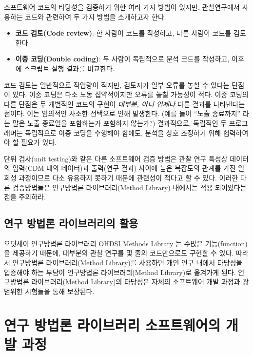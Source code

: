 \documentclass[11pt]{book}
\providecommand{\tightlist}{%
  \setlength{\itemsep}{0pt}\setlength{\parskip}{0pt}}
\theoremstyle{definition}
\theoremstyle{definition}
\theoremstyle{definition}
\theoremstyle{remark}
\begin{document}
소프트웨어 코드의 타당성을 검증하기 위한 여러 가지 방법이 있지만,
관찰연구에서 사용하는 코드와 관련하여 두 가지 방법을 소개하고자 한다.

\begin{itemize}
\tightlist
\item
  \textbf{코드 검토(Code review)}: 한 사람이 코드를 작성하고, 다른
  사람이 코드를 검토한다.
\item
  \textbf{이중 코딩(Double coding)}: 두 사람이 독립적으로 분석 코드를
  작성하고, 이후에 스크립트 실행 결과를 비교한다.
\end{itemize}

코드 검토는 일반적으로 작업량이 적지만, 검토자가 일부 오류를 놓칠 수
있다는 단점이 있다. 이중 코딩은 다소 노동 집약적이지만 오류를 놓칠
가능성이 적다. 이중 코딩의 다른 단점은 두 개별적인 코드의 구현이
\emph{대부분, 아니 언제나} 다른 결과를 나타낸다는 점이다. 이는 임의적인
사소한 선택으로 인해 발생한다. (예를 들어 ``노출 종료까지'' 라는 말은
노출 종료일을 포함하는가 포함하지 않는가?) 결과적으로, 독립적인 두
프로그래머는 독립적으로 이중 코딩을 수행해야 함에도, 분석을 상호
조정하기 위해 협력하여야 할 필요가 있다.

단위 검사(unit testing)와 같은 다른 소프트웨어 검증 방법은 관찰 연구
특성상 데이터의 입력(CDM 내의 데이터)과 출력(연구 결과) 사이에 높은
복잡도의 관계를 가진 일회성 과정이므로 다소 유용하지 못하기 때문에
관련성이 적다고 할 수 있다. 이러한 다른 검증방법들은 연구방법론
라이브러리(Method Library) 내에서는 적용 되어있다는 점을 주의하라.

\subsection{연구 방법론 라이브러리의 활용}\label{---}

오딧세이 연구방법론 라이브러리
\href{https://ohdsi.github.io/MethodsLibrary/}{OHDSI Methods Library} 는
수많은 기능(function)을 제공하기 때문에, 대부분의 관찰 연구를 몇 줄의
코드만으로도 구현할 수 있다. 따라서 연구방법론 라이브러리(Method
Library)를 사용하면 개인 연구 내에서 타당성을 입증해야 하는 부담이
연구방법론 라이브러리(Method Library)로 옮겨가게 된다. 연구방법론
라이브러리(Method Library)의 타당성은 자체의 소프트웨어 개발 과정과
광범위한 시험들을 통해 보장된다.

\section{연구 방법론 라이브러리 소프트웨어의 개발 과정}\label{-----}
\end{document}
